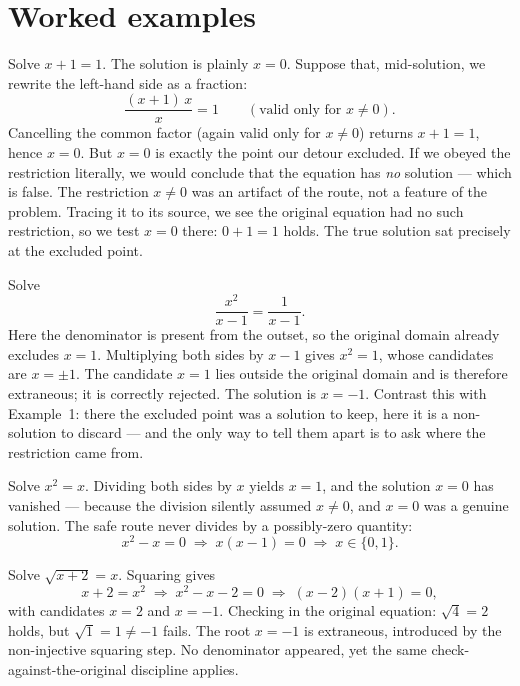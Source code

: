 \documentclass{essay}
\begin{document}
\section{Worked examples}

\begin{example}
  Solve \(x + 1 = 1\). The solution is plainly \(x = 0\). Suppose that, mid-solution, we rewrite
  the left-hand side as a fraction:
  \[ \frac{(x+1)\,x}{x} = 1 \qquad (\text{valid only for } x \neq 0). \]
  Cancelling the common factor (again valid only for \(x \neq 0\)) returns \(x + 1 = 1\), hence
  \(x = 0\). But \(x = 0\) is exactly the point our detour excluded. If we obeyed the restriction
  literally, we would conclude that the equation has \emph{no} solution --- which is false.
  The restriction \(x \neq 0\) was an artifact of the route, not a feature of the problem.
  Tracing it to its source, we see the original equation had no such restriction, so we test
  \(x=0\) there: \(0 + 1 = 1\) holds. The true solution sat precisely at the excluded point.
\end{example}

\begin{example}
  Solve
  \[ \frac{x^{2}}{x-1} = \frac{1}{x-1}. \]
  Here the denominator is present from the outset, so the original domain already excludes
  \(x = 1\). Multiplying both sides by \(x-1\) gives \(x^{2} = 1\), whose candidates are \(x = \pm 1\).
  The candidate \(x = 1\) lies outside the original domain and is therefore extraneous; it is
  correctly rejected. The solution is \(x = -1\). Contrast this with Example~1: there the
  excluded point was a solution to keep, here it is a non-solution to discard --- and the only
  way to tell them apart is to ask where the restriction came from.
\end{example}

\begin{example}
  Solve \(x^{2} = x\). Dividing both sides by \(x\) yields \(x = 1\), and the solution \(x = 0\) has
  vanished --- because the division silently assumed \(x \neq 0\), and \(x = 0\) was a genuine
  solution. The safe route never divides by a possibly-zero quantity:
  \[ x^{2} - x = 0 \;\Longrightarrow\; x(x-1) = 0 \;\Longrightarrow\; x \in \{0, 1\}. \]
\end{example}

\begin{example}
  Solve \(\sqrt{x+2} = x\). Squaring gives
  \[ x + 2 = x^{2} \;\Longrightarrow\; x^{2} - x - 2 = 0 \;\Longrightarrow\; (x-2)(x+1) = 0, \]
  with candidates \(x = 2\) and \(x = -1\). Checking in the original equation: \(\sqrt{4} = 2\)
  holds, but \(\sqrt{1} = 1 \neq -1\) fails. The root \(x = -1\) is extraneous, introduced by the
  non-injective squaring step. No denominator appeared, yet the same check-against-the-original
  discipline applies.
\end{example}
\end{document}
